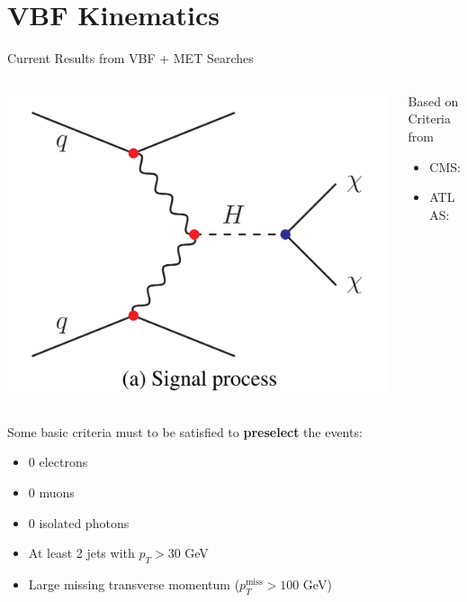 \documentclass{../../bredelebeamer}
\begin{document}
\section{VBF Kinematics}
\begin{frame}{Current Results from VBF + MET Searches}
    \begin{columns}
        \begin{column}{0.4\textwidth}
            \includegraphics[width=\textwidth]{../Images/VBF.png}
        \end{column}
        \begin{column}{0.6\textwidth}
            Based on Criteria from 
            \begin{itemize}
                \item CMS: \cite{CMS:2022qva}
                \item ATLAS:\cite{ATLAS:2022yvh}
            \end{itemize}
        \end{column}
    \end{columns}
    Some basic criteria must to be satisfied to \textbf{preselect} the events:
    \begin{itemize}
        \item 0 electrons
        \item 0 muons
        \item 0 isolated photons
        \item At least 2 jets with $p_T > 30$ GeV
        \item Large missing transverse momentum ($p_T^{\text{miss}} > 100$ GeV)
    \end{itemize}

\end{frame}
\end{document}
